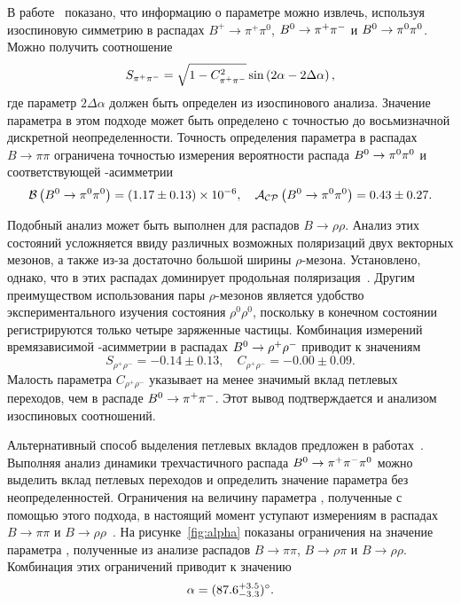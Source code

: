 В работе~\cite{alpha_isospin} показано, что информацию о параметре \aphi можно извлечь, используя изоспиновую симметрию в распадах $B^+\to\pi^+\pi^0$, $B^0\to\pi^+\pi^-$ и $B^0\to\pi^0\pi^0$.  Можно получить соотношение
\begin{equation}
 S_{\pi^+\pi^-} = \sqrt{1-C_{\pi^+\pi^-}^2}\sin\left(2\alpha - 2\Delta\alpha\right),
\end{equation}
где параметр $2\Delta\alpha$ должен быть определен из изоспинового анализа.  Значение параметра \aphi в этом подходе может быть определено с точностью до восьмизначной дискретной неопределенности.  Точность определения параметра \aphi в распадах $B\to\pi\pi$ ограничена точностью измерения вероятности распада $B^0\to\pi^0\pi^0$ и соответствующей \cpconj-асимметрии~\cite{hfag,babar_btopipi,belle_pit_alpha}
\begin{equation}
 \mathcal{B}\left(B^0\to\pi^0\pi^0\right) = (1.17\pm0.13)\times 10^{-6},\quad \mathcal{A}_\mathcal{CP}\left(B^0\to\pi^0\pi^0\right) = 0.43\pm0.27.
\end{equation}

Подобный анализ может быть выполнен для распадов $B\to\rho\rho$.  Анализ этих состояний усложняется ввиду различных возможных поляризаций двух векторных мезонов, а также из-за достаточно большой ширины $\rho$-мезона.  Установлено, однако, что в этих распадах доминирует продольная поляризация~\cite{babar_btorhoprho,belle_btorhoprho}.  Другим преимуществом использования пары $\rho$-мезонов является удобство экспериментального изучения состояния $\rho^0\rho^0$, поскольку в конечном состоянии регистрируются только четыре заряженные частицы.  Комбинация измерений времязависимой \cpconj-асимметрии в распадах $B^0\to\rho^+\rho^-$ приводит к значениям~\cite{hfag,babar_btorhoprho,belle_btorhoprho}
\begin{equation}
 S_{\rho^+\rho^-} = -0.14 \pm 0.13,\quad
 C_{\rho^+\rho^-} = -0.00 \pm 0.09.
\end{equation}
Малость параметра $C_{\rho^+\rho^-}$ указывает на менее значимый вклад петлевых переходов, чем в распаде $B^0\to\pi^+\pi^-$.  Этот вывод подтверждается и анализом изоспиновых соотношений.

Альтернативный способ выделения петлевых вкладов предложен в работах~\cite{btorhopi_theory1,btorhopi_theory2}.  Выполняя анализ динамики трехчастичного распада $B^0\to\pi^+\pi^-\pi^0$ можно выделить вклад петлевых переходов и определить значение параметра \aphi без неопределенностей. Ограничения на величину параметра \aphi, полученные с помощью этого подхода, в настоящий момент уступают измерениям в распадах $B\to\pi\pi$ и $B\to\rho\rho$~\cite{belle_rhopi,belle_rhopi_prd,babar_rhopi}.  На рисунке~\ref{fig:alpha} показаны ограничения на значение параметра \aphi, полученные из анализе распадов $B\to\pi\pi$, $B\to\rho\pi$ и $B\to\rho\rho$.  Комбинация этих ограничений приводит к значению~\cite{ckmfitter}
\begin{equation}
 \alpha = (87.6^{+3.5}_{-3.3})^{\circ}.
\end{equation}

